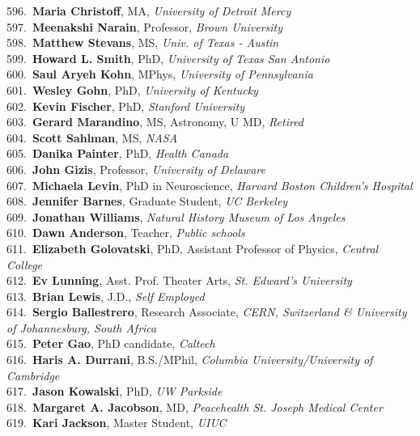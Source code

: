596.~{\bf Maria Christoff}, MA, {\sl University of Detroit Mercy} \\
597.~{\bf Meenakshi Narain}, Professor, {\sl Brown University} \\
598.~{\bf Matthew Stevans}, MS, {\sl Univ. of Texas - Austin} \\
599.~{\bf Howard L. Smith}, PhD, {\sl University of Texas San Antonio } \\
600.~{\bf Saul Aryeh Kohn}, MPhys, {\sl University of Pennsylvania} \\
601.~{\bf Wesley Gohn}, PhD, {\sl University of Kentucky} \\
602.~{\bf Kevin Fischer}, PhD, {\sl Stanford University} \\
603.~{\bf Gerard Marandino}, MS, Astronomy, U MD, {\sl Retired} \\
604.~{\bf Scott Sahlman}, MS, {\sl NASA} \\
605.~{\bf Danika Painter}, PhD, {\sl Health Canada} \\
606.~{\bf John Gizis}, Professor, {\sl University of Delaware} \\
607.~{\bf Michaela Levin}, PhD in Neuroscience, {\sl Harvard Boston Children's Hospital} \\
608.~{\bf Jennifer Barnes}, Graduate Student, {\sl UC Berkeley} \\
609.~{\bf Jonathan Williams}, {\sl Natural History Museum of Los Angeles} \\
610.~{\bf Dawn Anderson}, Teacher, {\sl Public schools} \\
611.~{\bf Elizabeth Golovatski}, PhD, Assistant Professor of Physics, {\sl Central College} \\
612.~{\bf Ev Lunning}, Asst. Prof. Theater Arts, {\sl St. Edward's University} \\
613.~{\bf Brian Lewis}, J.D., {\sl Self Employed} \\
614.~{\bf Sergio Ballestrero}, Research Associate, {\sl CERN, Switzerland \& University of Johannesburg, South Africa} \\
615.~{\bf Peter Gao}, PhD candidate, {\sl Caltech} \\
616.~{\bf Haris A. Durrani}, B.S./MPhil, {\sl Columbia University/University of Cambridge} \\
617.~{\bf Jason Kowalski}, PhD, {\sl UW Parkside} \\
618.~{\bf Margaret A. Jacobson}, MD, {\sl Peacehealth St. Joseph Medical Center} \\
619.~{\bf Kari Jackson}, Master Student, {\sl UIUC} \\
